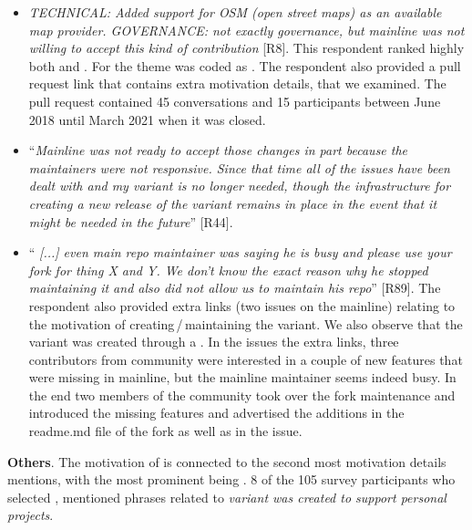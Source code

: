 \begin{itemize}[leftmargin=*]
\item \emph{TECHNICAL: Added support for OSM (open street maps) as an available map provider. GOVERNANCE: not exactly governance, but mainline was not willing to accept this kind of contribution} [R8]. This respondent ranked highly both  and . For  the theme was coded as . The respondent also provided a \gh pull request link that contains extra motivation details, that we examined. The pull request contained 45 conversations and 15 participants between June 2018 until March 2021 when it was closed.

\item ``\emph{Mainline was not ready to accept those changes in part because the maintainers were not responsive. Since that time all of the issues have been dealt with and my variant is no longer needed, though the infrastructure for creating a new release of the variant remains in place in the event that it might be needed in the future}'' [R44].

\item ``\emph{%
[...] even main repo maintainer was saying he is busy and please use your fork for thing X and Y. We don't know the exact reason why he stopped maintaining it and also did not allow us to maintain his repo}'' [R89]. The respondent also provided extra links (two issues on the mainline) relating to the motivation of creating\,/\,maintaining the variant. We also observe that the variant was created through a .
In the issues the extra links, three contributors from community were interested in a couple of new features that were missing in mainline, but the mainline maintainer seems indeed busy. In the end two members of the community took over the fork maintenance and introduced the missing features and advertised the additions in the \textsf{readme.md} file of the fork as well as in the issue.

\end{itemize}


\nd \textbf{Others}. The motivation of  is connected to the second most motivation details mentions, with the most prominent being . 8 of the 105 survey participants who selected , mentioned phrases related to \emph{variant was created to support personal projects}.


